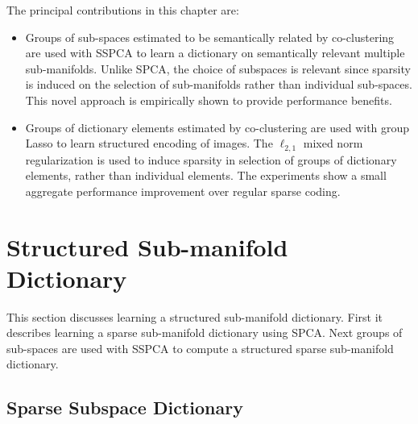 The principal contributions in this chapter are:
\begin{itemize}
 \item  Groups of sub-spaces estimated to be semantically related by co-clustering are used with SSPCA to learn a dictionary on semantically relevant multiple sub-manifolds. Unlike SPCA, the choice of subspaces is relevant since sparsity is induced on the selection of sub-manifolds rather than individual sub-spaces. This novel approach is empirically shown to provide performance benefits. 
 
 \item Groups of dictionary elements estimated by co-clustering are used with group Lasso to learn structured encoding of images. The $\ell_{2,1}$ mixed norm regularization is used to induce sparsity in selection of groups of dictionary elements, rather than individual elements. The experiments show a small aggregate performance improvement over regular sparse coding.
\end{itemize}

\section[Structured Sub-manifold Dictionary]{Structured Sub-manifold Dictionary}
\label{ch_groupsparse_sec_manifold}

This section discusses learning a structured sub-manifold dictionary. First it describes learning a sparse sub-manifold dictionary using SPCA. Next groups of sub-spaces are used with SSPCA to compute a structured sparse sub-manifold dictionary.  

\subsection[Sparse Subspace Dictionary]{Sparse Subspace Dictionary}
\label{ch_groupsparse_subsec_sparsepca}

